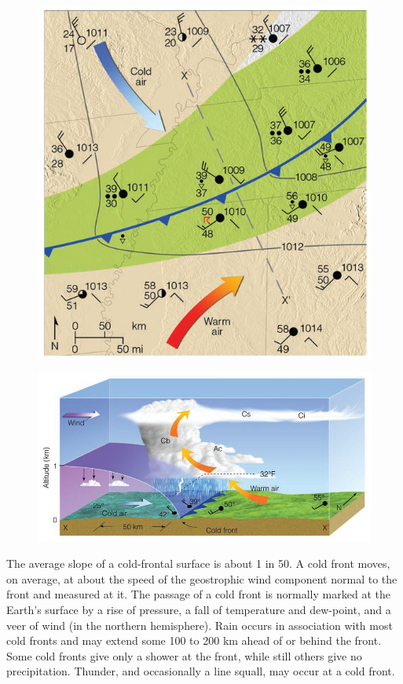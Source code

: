 \documentclass[12pt,oneside]{book}
\begin{document}
\begin{figure}

{\centering \includegraphics[width=0.8\linewidth]{figures/Figure623} 

}

\caption{ }\label{fig:Fig623}
\end{figure}

\begin{figure}

{\centering \includegraphics[width=0.8\linewidth]{figures/Figure623b} 

}

\caption{ }\label{fig:Fig623b}
\end{figure}

The average slope of a cold-frontal surface is about 1 in 50. A cold
front moves, on average, at about the speed of the geostrophic wind
component normal to the front and measured at it. The passage of a cold
front is normally marked at the Earth's surface by a rise of pressure, a
fall of temperature and dew-point, and a veer of wind (in the northern
hemisphere). Rain occurs in association with most cold fronts and may
extend some 100 to 200 km ahead of or behind the front. Some cold fronts
give only a shower at the front, while still others give no
precipitation. Thunder, and occasionally a line squall, may occur at a
cold front.
\end{document}
